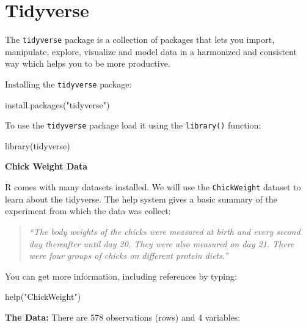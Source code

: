\documentclass[
  14pt,
]{memoir}
\newenvironment{Shaded}{\begin{snugshade}}{\end{snugshade}}
\newcommand{\FunctionTok}[1]{\textcolor[rgb]{0.00,0.00,0.00}{#1}}
\newcommand{\NormalTok}[1]{#1}
\newcommand{\StringTok}[1]{\textcolor[rgb]{0.31,0.60,0.02}{#1}}
\begin{document}
\hypertarget{tidyverse}{%
\section{Tidyverse}\label{tidyverse}}

The \texttt{tidyverse} package is a collection of packages that lets you import,
manipulate, explore, visualize and model data in a harmonized and consistent way which
helps you to be more productive.

Installing the \texttt{tidyverse} package:

\begin{Shaded}
\begin{Highlighting}[]
\FunctionTok{install.packages}\NormalTok{(}\StringTok{"tidyverse"}\NormalTok{)}
\end{Highlighting}
\end{Shaded}

To use the \texttt{tidyverse} package load it using the \texttt{library()} function:

\begin{Shaded}
\begin{Highlighting}[]
\FunctionTok{library}\NormalTok{(tidyverse)}
\end{Highlighting}
\end{Shaded}

\textbf{Chick Weight Data}

R comes with many datasets installed. We will use the \texttt{ChickWeight} dataset
to learn about the tidyverse. The help system gives a basic summary of the experiment from
which the data was collect:

\begin{quote}
\emph{``The body weights of the chicks were measured at birth and every second day thereafter
until day 20. They were also measured on day 21. There were four groups of chicks on
different protein diets.''}
\end{quote}

You can get more information, including references by typing:

\begin{Shaded}
\begin{Highlighting}[]
\FunctionTok{help}\NormalTok{(}\StringTok{"ChickWeight"}\NormalTok{)}
\end{Highlighting}
\end{Shaded}

\textbf{The Data: }
There are 578 observations (rows) and 4 variables:
\end{document}
